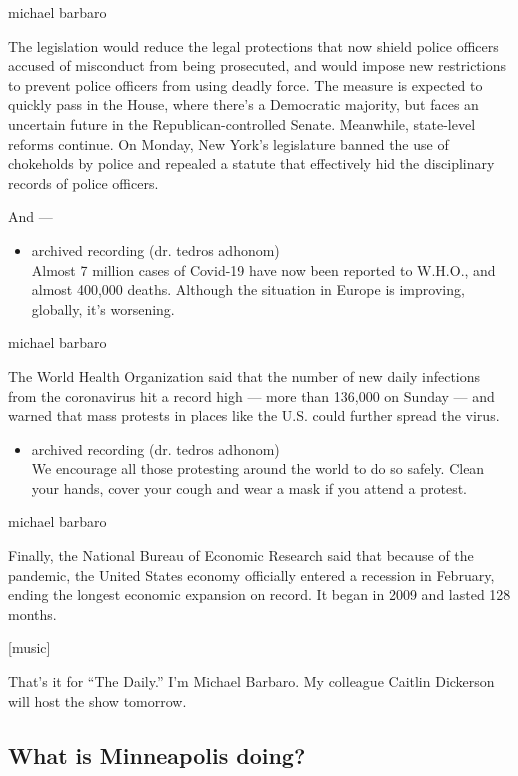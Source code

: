 michael barbaro

The legislation would reduce the legal protections that now shield
police officers accused of misconduct from being prosecuted, and would
impose new restrictions to prevent police officers from using deadly
force. The measure is expected to quickly pass in the House, where
there's a Democratic majority, but faces an uncertain future in the
Republican-controlled Senate. Meanwhile, state-level reforms continue.
On Monday, New York's legislature banned the use of chokeholds by police
and repealed a statute that effectively hid the disciplinary records of
police officers.

And ---

\begin{itemize}
\tightlist
\item
  archived recording (dr. tedros adhonom)\\
  Almost 7 million cases of Covid-19 have now been reported to W.H.O.,
  and almost 400,000 deaths. Although the situation in Europe is
  improving, globally, it's worsening.
\end{itemize}

michael barbaro

The World Health Organization said that the number of new daily
infections from the coronavirus hit a record high --- more than 136,000
on Sunday --- and warned that mass protests in places like the U.S.
could further spread the virus.

\begin{itemize}
\tightlist
\item
  archived recording (dr. tedros adhonom)\\
  We encourage all those protesting around the world to do so safely.
  Clean your hands, cover your cough and wear a mask if you attend a
  protest.
\end{itemize}

michael barbaro

Finally, the National Bureau of Economic Research said that because of
the pandemic, the United States economy officially entered a recession
in February, ending the longest economic expansion on record. It began
in 2009 and lasted 128 months.

{[}music{]}

That's it for ``The Daily.'' I'm Michael Barbaro. My colleague Caitlin
Dickerson will host the show tomorrow.

\hypertarget{what-is-minneapolis-doing}{%
\subsection{What is Minneapolis
doing?}\label{what-is-minneapolis-doing}}

